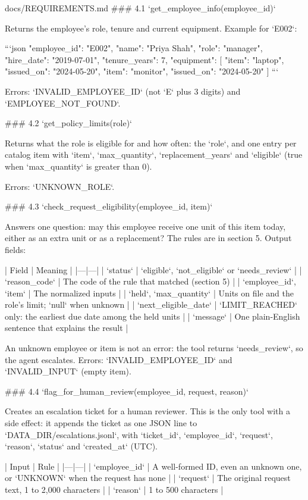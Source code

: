 \documentclass[11pt,letterpaper]{article}
\renewcommand{\_}{\textunderscore\allowbreak}
\begin{document}
\begin{appendixpromptbox}{docs/REQUIREMENTS.md}
### 4.1 `get_employee_info(employee_id)`

Returns the employee's role, tenure and current equipment. Example for `E002`:

```json
{
  "employee_id": "E002",
  "name": "Priya Shah",
  "role": "manager",
  "hire_date": "2019-07-01",
  "tenure_years": 7,
  "equipment": [
    {"item": "laptop", "issued_on": "2024-05-20"},
    {"item": "monitor", "issued_on": "2024-05-20"}
  ]
}
```

Errors: `INVALID_EMPLOYEE_ID` (not `E` plus 3 digits) and `EMPLOYEE_NOT_FOUND`.

### 4.2 `get_policy_limits(role)`

Returns what the role is eligible for and how often: the `role`, and one entry per catalog item
with `item`, `max_quantity`, `replacement_years` and `eligible` (true when `max_quantity` is
greater than 0).

Errors: `UNKNOWN_ROLE`.

### 4.3 `check_request_eligibility(employee_id, item)`

Answers one question: may this employee receive one unit of this item today, either as an extra
unit or as a replacement? The rules are in section 5. Output fields:

| Field | Meaning |
|---|---|
| `status` | `eligible`, `not_eligible` or `needs_review` |
| `reason_code` | The code of the rule that matched (section 5) |
| `employee_id`, `item` | The normalized inputs |
| `held`, `max_quantity` | Units on file and the role's limit; `null` when unknown |
| `next_eligible_date` | `LIMIT_REACHED` only: the earliest due date among the held units |
| `message` | One plain-English sentence that explains the result |

An unknown employee or item is not an error: the tool returns `needs_review`, so the agent
escalates. Errors: `INVALID_EMPLOYEE_ID` and `INVALID_INPUT` (empty item).

### 4.4 `flag_for_human_review(employee_id, request, reason)`

Creates an escalation ticket for a human reviewer. This is the only tool with a side effect: it
appends the ticket as one JSON line to `DATA_DIR/escalations.jsonl`, with `ticket_id`,
`employee_id`, `request`, `reason`, `status` and `created_at` (UTC).

| Input | Rule |
|---|---|
| `employee_id` | A well-formed ID, even an unknown one, or `UNKNOWN` when the request has none |
| `request` | The original request text, 1 to 2,000 characters |
| `reason` | 1 to 500 characters |


\end{appendixpromptbox}
\end{document}
